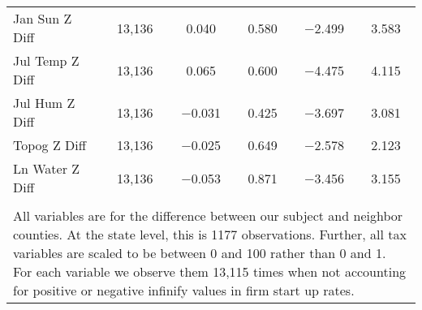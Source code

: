 \begin{table}[!htbp]
\begin{tabular}{@{\extracolsep{5pt}}lccccc}
Jan Sun Z Diff & 13,136 & 0.040 & 0.580 & $-$2.499 & 3.583 \\ 
Jul Temp Z Diff & 13,136 & 0.065 & 0.600 & $-$4.475 & 4.115 \\ 
Jul Hum Z Diff & 13,136 & $-$0.031 & 0.425 & $-$3.697 & 3.081 \\ 
Topog Z Diff & 13,136 & $-$0.025 & 0.649 & $-$2.578 & 2.123 \\ 
Ln Water Z Diff & 13,136 & $-$0.053 & 0.871 & $-$3.456 & 3.155 \\ 
\hline \\[-1.8ex] 
\multicolumn{6}{l}{All variables are for the difference between our subject and neighbor counties. At the state level, this is 1177 observations. Further, all tax variables are scaled to be between 0 and 100 rather than 0 and 1. For each variable we observe them 13,115 times when not accounting for positive or negative infinify values in firm start up rates.} \\ 
\end{tabular} 
\end{table} 
